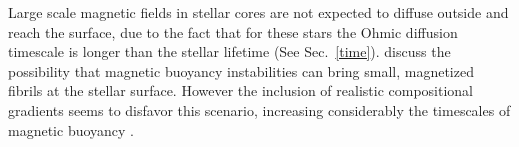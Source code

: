 Large scale magnetic fields in stellar cores are not expected to diffuse outside and reach the surface, due to the fact that for these stars the Ohmic diffusion timescale 
is longer than the stellar lifetime (See Sec.~\ref{time}). \citet{MacGregor_2003} discuss the possibility that magnetic buoyancy instabilities can bring small, magnetized fibrils at the stellar surface. However the inclusion of realistic compositional gradients seems to disfavor this scenario, increasing considerably the timescales of magnetic buoyancy \citep{MacDonald_2004}.  







  
 
  
  
  
  
  
  
